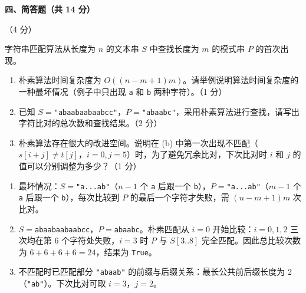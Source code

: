 \clearpage

\textbf{四、简答题（共 14 分）}

\begin{question}[字符串匹配]（4 分）

字符串匹配算法从长度为 $n$ 的文本串 $S$ 中查找长度为 $m$ 的模式串 $P$ 的首次出现。

\begin{enumerate}
  \item 朴素算法时间复杂度为 $O((n-m+1)m)$。请举例说明算法时间复杂度的一种最坏情况（例子中只出现 \texttt{a} 和 \texttt{b} 两种字符）。（1 分）
  \item 已知 $S=$\texttt{"abaabaabaabcc"}，$P=$\texttt{"abaabc"}，采用朴素算法进行查找，请写出字符比对的总次数和查找结果。（2 分）
  \item 朴素算法存在很大的改进空间。说明在 (b) 中第一次出现不匹配（$s[i+j]\neq t[j]$，$i=0,j=5$）时，为了避免冗余比对，下次比对时 $i$ 和 $j$ 的值可以分别调整为多少？（1 分）
\end{enumerate}

\begin{solution}
\begin{enumerate}
  \item 最坏情况：$S=$\texttt{"a...ab"}（$n-1$ 个 \texttt{a} 后跟一个 \texttt{b}），$P=$\texttt{"a...ab"}（$m-1$ 个 \texttt{a} 后跟一个 \texttt{b}），每次比较到 $P$ 的最后一个字符才失败，需 $(n-m+1)m$ 次比对。
  \item $S=$\texttt{abaabaabaabcc}，$P=$\texttt{abaabc}。朴素匹配从 $i=0$ 开始比较：$i=0,1,2$ 三次均在第 $6$ 个字符处失败，$i=3$ 时 $P$ 与 $S[3..8]$ 完全匹配。因此总比较次数为 $6+6+6+6=24$，结果为 \texttt{True}。
  \item 不匹配时已匹配部分 \texttt{"abaab"} 的前缀与后缀关系：最长公共前后缀长度为 2（\texttt{"ab"}）。下次比对可取 $i=3$，$j=2$。
\end{enumerate}
\end{solution}
\end{question}


